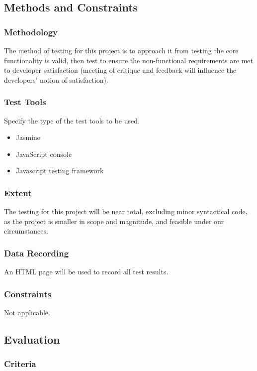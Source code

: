 \documentclass[11pt, oneside]{article}   	%
\begin{document}
\subsection{Methods and Constraints}
\subsubsection{Methodology}
The method of testing for this project is to approach it from testing the core functionality is valid, then test to ensure the non-functional requirements are met to developer satisfaction (meeting of critique and feedback will influence the developers' notion of satisfaction).

\subsubsection{Test Tools}
Specify the type of the test tools to be used.
\begin{itemize}
\item Jasmine
\item JavaScript console
\item Javascript testing framework
\end{itemize}

\subsubsection{Extent}
The testing for this project will be near total, excluding minor syntactical code, as the project is smaller in scope and magnitude, and feasible under our circumstances.

\subsubsection{Data Recording}
An HTML page will be used to record all test results. 

\subsubsection{Constraints}
Not applicable.

\subsection{Evaluation}
\subsubsection{Criteria}
\end{document}
